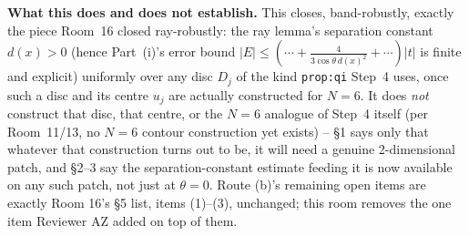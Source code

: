 \documentclass[11pt]{article}
\begin{document}
\textbf{What this does and does not establish.} This closes, band-robustly, exactly the piece Room~16
closed ray-robustly: the ray lemma's separation constant $d(x)>0$ (hence Part~(i)'s error bound
$|E|\le(\cdots+\tfrac4{3\cos\theta\,d(x)^2}+\cdots)|t|$ is finite and explicit) uniformly over any disc
$D_j$ of the kind \texttt{prop:qi} Step~4 uses, once such a disc and its centre $u_j$ are actually
constructed for $N=6$. It does \emph{not} construct that disc, that centre, or the $N=6$ analogue of
Step~4 itself (per Room~11/13, no $N=6$ contour construction yet exists) -- \S1 says only that whatever
that construction turns out to be, it will need a genuine 2-dimensional patch, and \S2--3 say the
separation-constant estimate feeding it is now available on any such patch, not just at $\theta=0$.
Route (b)'s remaining open items are exactly Room 16's \S5 list, items (1)--(3), unchanged; this room
removes the one item Reviewer AZ added on top of them.
\end{document}
